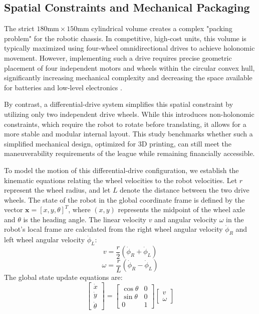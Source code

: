 \documentclass[a4paper,twoside,12pt]{report}
\begin{document}
\subsection{Spatial Constraints and Mechanical Packaging}
The strict $180\text{mm} \times 150\text{mm}$ cylindrical volume creates a complex "packing problem" for the robotic chassis. In competitive, high-cost units, this volume is typically maximized using four-wheel omnidirectional drives to achieve holonomic movement. However, implementing such a drive requires precise geometric placement of four independent motors and wheels within the circular convex hull, significantly increasing mechanical complexity and decreasing the space available for batteries and low-level electronics \citep{ateam2023tdp}.

By contrast, a differential-drive system simplifies this spatial constraint by utilizing only two independent drive wheels. While this introduces non-holonomic constraints, which require the robot to rotate before translating, it allows for a more stable and modular internal layout. This study benchmarks whether such a simplified mechanical design, optimized for 3D printing, can still meet the maneuverability requirements of the league while remaining financially accessible.

To model the motion of this differential-drive configuration, we establish the kinematic equations relating the wheel velocities to the robot velocities. Let $r$ represent the wheel radius, and let $L$ denote the distance between the two drive wheels. The state of the robot in the global coordinate frame is defined by the vector $\mathbf{x} = [x, y, \theta]^T$, where $(x, y)$ represents the midpoint of the wheel axle and $\theta$ is the heading angle. The linear velocity $v$ and angular velocity $\omega$ in the robot's local frame are calculated from the right wheel angular velocity $\dot{\phi}_R$ and left wheel angular velocity $\dot{\phi}_L$:
\begin{equation}
v = \frac{r}{2} (\dot{\phi}_R + \dot{\phi}_L)
\label{eq:linear_vel}
\end{equation}
\begin{equation}
\omega = \frac{r}{L} (\dot{\phi}_R - \dot{\phi}_L)
\label{eq:angular_vel}
\end{equation}
The global state update equations are:
\begin{equation}
\begin{bmatrix}
\dot{x} \\
\dot{y} \\
\dot{\theta}
\end{bmatrix} = 
\begin{bmatrix}
\cos\theta & 0 \\
\sin\theta & 0 \\
0 & 1
\end{bmatrix}
\begin{bmatrix}
v \\
\omega
\end{bmatrix}
\label{eq:kinematics}
\end{equation}
\end{document}
